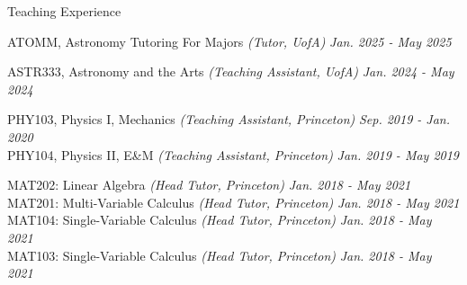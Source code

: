 \documentclass{JMH_CV}
\begin{document}

\begin{rSection}{Teaching Experience}

ATOMM, Astronomy Tutoring For Majors \textit{(Tutor, UofA)} \hfill \textit{Jan. 2025 - May 2025}

ASTR333, Astronomy and the Arts \textit{(Teaching Assistant, UofA)} \hfill \textit{Jan. 2024 - May 2024}

PHY103, Physics I, Mechanics \textit{(Teaching Assistant, Princeton)} \hfill \textit{Sep. 2019 - Jan. 2020} \\
PHY104, Physics II, E\&M \textit{(Teaching Assistant, Princeton)} \hfill \textit{Jan. 2019 - May 2019}

MAT202: Linear Algebra \textit{(Head Tutor, Princeton)} \hfill \textit{Jan. 2018 - May 2021} \\
MAT201: Multi-Variable Calculus \textit{(Head Tutor, Princeton)} \hfill \textit{Jan. 2018 - May 2021} \\
MAT104: Single-Variable Calculus \textit{(Head Tutor, Princeton)} \hfill \textit{Jan. 2018 - May 2021} \\
MAT103: Single-Variable Calculus \textit{(Head Tutor, Princeton)} \hfill \textit{Jan. 2018 - May 2021}

\end{rSection}

\end{document}
